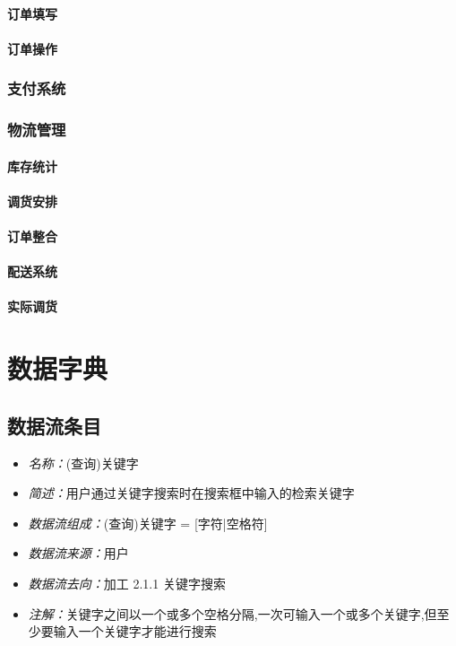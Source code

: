 \documentclass{article}
\begin{document}
\begin{CJK*}{UTF8}{gbsn}
\paragraph{订单填写}
\paragraph{订单操作}
\subsubsection{支付系统}
\subsubsection{物流管理}
\paragraph{库存统计}
\paragraph{调货安排}
\paragraph{订单整合}
\paragraph{配送系统}
\paragraph{实际调货}
\section{数据字典}
\subsection{数据流条目}

\begin{itemize}
	\item \textit{名称：}(查询)关键字
	\item \textit{简述：}用户通过关键字搜索时在搜索框中输入的检索关键字
	\item \textit{数据流组成：}(查询)关键字 = [字符|空格符]
	\item \textit{数据流来源：}用户
	\item \textit{数据流去向：}加工 2.1.1 关键字搜索
	\item \textit{注解：}关键字之间以一个或多个空格分隔,一次可输入一个或多个关键字,但至少要输入一个关键字才能进行搜索
\end{itemize}


\end{CJK*}
\end{document}
